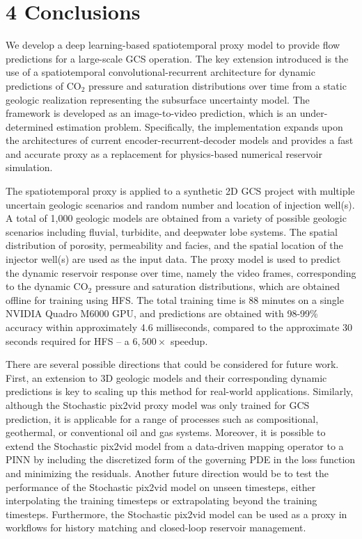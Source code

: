 \documentclass[10pt, twoside]{article}
\begin{document}
\section*{\textbf{4 Conclusions}}

We develop a deep learning-based spatiotemporal proxy model to provide flow predictions for a large-scale GCS operation. The key extension introduced is the use of a spatiotemporal convolutional-recurrent architecture for dynamic predictions of CO$_2$ pressure and saturation distributions over time from a static geologic realization representing the subsurface uncertainty model. The framework is developed as an image-to-video prediction, which is an under-determined estimation problem. Specifically, the implementation expands upon the architectures of current encoder-recurrent-decoder models and provides a fast and accurate proxy as a replacement for physics-based numerical reservoir simulation.

The spatiotemporal proxy is applied to a synthetic 2D GCS project with multiple uncertain geologic scenarios and random number and location of injection well(s). A total of 1,000 geologic models are obtained from a variety of possible geologic scenarios including fluvial, turbidite, and deepwater lobe systems. The spatial distribution of porosity, permeability and facies, and the spatial location of the injector well(s) are used as the input data. The proxy model is used to predict the dynamic reservoir response over time, namely the video frames, corresponding to the dynamic CO$_2$ pressure and saturation distributions, which are obtained offline for training using HFS. The total training time is 88 minutes on a single NVIDIA Quadro M6000 GPU, and predictions are obtained with 98-99\% accuracy within approximately 4.6 milliseconds, compared to the approximate 30 seconds required for HFS – a $6,500\times$ speedup. 

There are several possible directions that could be considered for future work. First, an extension to 3D geologic models and their corresponding dynamic predictions is key to scaling up this method for real-world applications. Similarly, although the Stochastic pix2vid proxy model was only trained for GCS prediction, it is applicable for a range of processes such as compositional, geothermal, or conventional oil and gas systems. Moreover, it is possible to extend the Stochastic pix2vid model from a data-driven mapping operator to a PINN by including the discretized form of the governing PDE in the loss function and minimizing the residuals. Another future direction would be to test the performance of the Stochastic pix2vid model on unseen timesteps, either interpolating the training timesteps or extrapolating beyond the training timesteps. Furthermore, the Stochastic pix2vid model can be used as a proxy in workflows for history matching and closed-loop reservoir management. 
\end{document}
